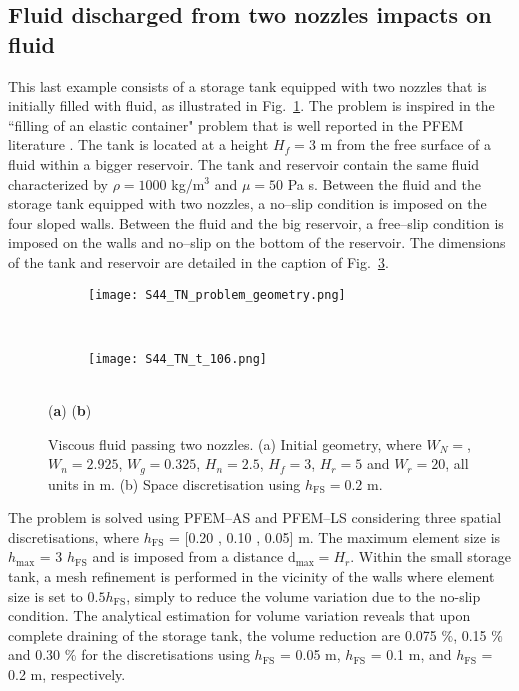 \documentclass[final,3p,times]{elsarticle}
\begin{document}
\newpage
\subsection{Fluid discharged from two nozzles impacts on fluid}

This last example consists of a storage tank equipped with two nozzles that is initially filled with fluid, as illustrated in Fig.~\ref{Fig:TN_geo_a}. The problem is inspired in the ``filling of an elastic container" problem that is well reported in the PFEM literature \citep{franci2016bunified}. The tank is located at a height $H_f = 3$ m from the free surface of a fluid within a bigger reservoir. The tank and reservoir contain the same fluid characterized by $\rho = 1000$ kg/m$^3$ and $\mu = 50$ Pa s. Between the fluid and the storage tank equipped with two nozzles, a no--slip condition is imposed on the four sloped walls. Between the fluid and the big reservoir, a free--slip condition is imposed on the walls and no--slip on the bottom of the reservoir. The dimensions of the tank and reservoir are detailed in the caption of Fig.~\ref{Fig:TN_geo}. 
 
\begin{figure}[t!]
\captionsetup[subfigure]{labelformat=empty}
\centering 
	\begin{subfigure}[b]{0.33\textwidth}
		\texttt{[image: S44\_TN\_problem\_geometry.png]}
		\caption{}
		\label{Fig:TN_geo_a}
	\end{subfigure}
	~\hspace{10mm}
	\begin{subfigure}[b]{0.36\textwidth}	
		\texttt{[image: S44\_TN\_t\_106.png]}
		\caption{}
		\label{Fig:TN_geo_b}
	\end{subfigure}
	\\
	\vspace{-50mm}
	\hspace{-60mm} \footnotesize{(\textbf{a})} \hspace{70mm} (\textbf{b}) 
	\\
	\vspace{42mm}
\caption{Viscous fluid passing two nozzles. (a) Initial geometry, where $W_N = $, $W_n = 2.925$, $W_g= 0.325$, $H_n = 2.5$, $H_f =3$, $H_r = 5$ and $W_r=20$, all units in m. (b) Space discretisation using $h_\mathrm{FS} = 0.2$ m.
}
\label{Fig:TN_geo}
\end{figure}

The problem is solved using PFEM--AS and PFEM--LS considering three spatial discretisations, where $h_\mathrm{FS}$ = [0.20 , 0.10 , 0.05] m. The maximum element size is $h_\mathrm{max}$ = 3 $h_\mathrm{FS}$ and is imposed from a distance $\mathrm{d}_\mathrm{max} = H_r$. Within the small storage tank, a mesh refinement is performed in the vicinity of the walls where element size is set to $0.5 h_\mathrm{FS}$, simply to reduce the volume variation due to the no-slip condition. The analytical estimation for volume variation reveals that upon complete draining of the storage tank, the volume reduction are 0.075 $\%$, 0.15 $\%$ and 0.30 $\%$ for the discretisations using $h_\mathrm{FS}$ = 0.05 m, $h_\mathrm{FS}$ = 0.1 m, and $h_\mathrm{FS}$ = 0.2 m, respectively.  
\end{document}
